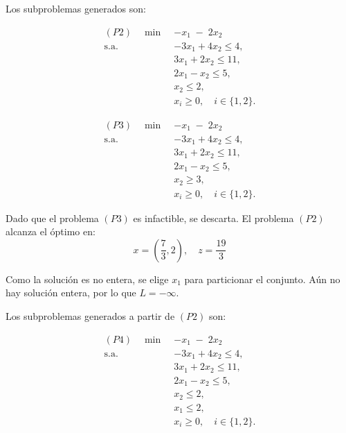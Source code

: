\begin{enumerate}
  Los subproblemas generados son:

\begin{equation}
\begin{aligned}
(P2)\quad \min\;& -x_1 \;-\; 2x_2 \\
\text{s.a.}\;& -3x_{1} + 4x_{2} \le 4,\\
& 3x_{1} + 2x_{2} \le 11,\\
& 2x_{1} - x_{2} \le 5,\\
& x_{2} \le 2,\\
& x_{i} \ge 0,\quad i\in\{1,2\}.
\end{aligned}
\end{equation}

\begin{equation}
\begin{aligned}
(P3)\quad \min\;& -x_1 \;-\; 2x_2 \\
\text{s.a.}\;& -3x_{1} + 4x_{2} \le 4,\\
& 3x_{1} + 2x_{2} \le 11,\\
& 2x_{1} - x_{2} \le 5,\\
& x_{2} \ge 3,\\
& x_{i} \ge 0,\quad i\in\{1,2\}.
\end{aligned}
\end{equation}

Dado que el problema $(P3)$ es infactible, se descarta. El problema $(P2)$ alcanza el óptimo en:
\begin{equation}
    x=\left(\frac{7}{3},2\right), \quad z= \frac{19}{3}
\end{equation}
    
Como la solución es no entera, se elige $x_1$ para particionar el conjunto. Aún no hay solución entera, por lo que $L=-\infty$.

Los subproblemas generados a partir de $(P2)$ son:

\begin{equation}
\begin{aligned}
(P4)\quad \min\;& -x_1 \;-\; 2x_2\\
\text{s.a.}\;& -3x_{1} + 4x_{2} \le 4,\\
& 3x_{1} + 2x_{2} \le 11,\\
& 2x_{1} - x_{2} \le 5,\\
& x_{2} \le 2,\\
& x_{1} \le 2,\\
& x_{i} \ge 0,\quad i\in\{1,2\}.
\end{aligned}
\end{equation}


\end{enumerate}

